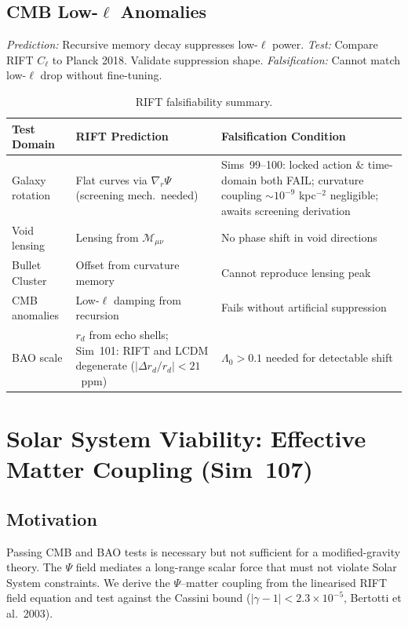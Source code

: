 \documentclass[12pt,a4paper]{article}
\begin{document}
\subsection{CMB Low-\texorpdfstring{$\ell$}{ell} Anomalies}
\emph{Prediction:} Recursive memory decay suppresses low-$\ell$ power.
\emph{Test:} Compare RIFT $C_\ell$ to Planck 2018. Validate suppression shape.
\emph{Falsification:} Cannot match low-$\ell$ drop without fine-tuning.

\begin{table}[ht]
\centering
\caption{RIFT falsifiability summary.}
\begin{tabular}{lll}
\toprule
Test Domain & RIFT Prediction & Falsification Condition \\
\midrule
Galaxy rotation & Flat curves via $\nabla_r\Psi$ (screening mech.\ needed) & Sims~99--100: locked action \& time-domain both FAIL; curvature coupling $\sim10^{-9}$ kpc$^{-2}$ negligible; awaits screening derivation \\
Void lensing & Lensing from $\mathcal{M}_{\mu\nu}$ & No phase shift in void directions \\
Bullet Cluster & Offset from curvature memory & Cannot reproduce lensing peak \\
CMB anomalies & Low-$\ell$ damping from recursion & Fails without artificial suppression \\
BAO scale & $r_d$ from echo shells; Sim~101: RIFT and LCDM degenerate ($|\Delta r_d/r_d|<21$~ppm) & $\Lambda_0>0.1$ needed for detectable shift \\
\bottomrule
\end{tabular}
\end{table}

\section{Solar System Viability: Effective Matter Coupling (Sim~107)}
\label{sec:sim107}

\subsection{Motivation}

Passing CMB and BAO tests is necessary but not sufficient for a modified-gravity
theory.  The $\Psi$ field mediates a long-range scalar force that must not
violate Solar System constraints.  We derive the $\Psi$--matter coupling from
the linearised RIFT field equation and test against the Cassini bound
($|\gamma-1|<2.3\times10^{-5}$, Bertotti et al.\ 2003).
\end{document}
